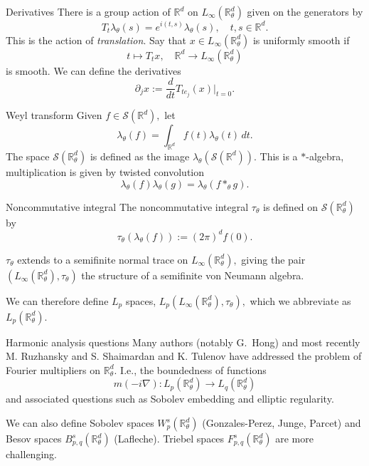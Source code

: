 \documentclass{beamer}
\numberwithin{equation}{section}
\theoremstyle{plain}
\theoremstyle{plain}
\theoremstyle{definition}
\theoremstyle{plain}
\theoremstyle{plain}
\theoremstyle{definition}
\newcommand{\Rl}{\mathbb{R}}
\newcommand{\Sc}{\mathcal{S}}
\begin{document}
\begin{frame}{Derivatives}
    There is a group action of $\Rl^d$ on $L_\infty(\Rl^d_\theta)$ given on the generators by
    \[
        T_{t}\lambda_\theta(s) = e^{i(t,s)}\lambda_\theta(s),\quad t,s\in \Rl^d.
    \]
    This is the action of \emph{translation}. Say that $x \in L_{\infty}(\Rl^d_\theta)$ is uniformly smooth if
    \[
        t\mapsto T_tx,\quad \Rl^d\to L_{\infty}(\Rl^d_\theta)
    \]
    is smooth. We can define the derivatives
    \[
        \partial_jx := \frac{d}{dt} T_{te_j}(x)|_{t=0}.
    \]
\end{frame}

\begin{frame}{Weyl transform}
    Given $f \in \Sc(\Rl^d),$ let
    \[
        \lambda_\theta(f) = \int_{\Rl^d} f(t)\lambda_\theta(t)\,dt.
    \]
    The space $\Sc(\Rl^d_\theta)$ is defined as the image $\lambda_\theta(\Sc(\Rl^d)).$ This is a $*$-algebra, multiplication is given by twisted convolution
    \[
        \lambda_\theta(f)\lambda_\theta(g) = \lambda_\theta(f\ast_\theta g).
    \]
\end{frame}

\begin{frame}{Noncommutative integral}
    The noncommutative integral $\tau_\theta$ is defined on $\Sc(\Rl^d_\theta)$ by
    \[
        \tau_\theta(\lambda_\theta(f)) := (2\pi)^d f(0).
    \]
    \begin{theorem}
        $\tau_\theta$ extends to a semifinite normal trace on $L_{\infty}(\Rl^d_\theta),$ giving the pair $(L_{\infty}(\Rl^d_\theta),\tau_\theta)$ the structure of a semifinite von Neumann algebra.
    \end{theorem}
    We can therefore define $L_p$ spaces, $L_p(L_{\infty}(\Rl^d_\theta),\tau_\theta),$ which we abbreviate as $L_p(\Rl^d_\theta).$
\end{frame}

\begin{frame}{Harmonic analysis questions}
    Many authors (notably G.~Hong) and most recently M. Ruzhansky and S. Shaimardan and K. Tulenov have addressed the problem of Fourier multipliers on $\Rl^d_\theta.$ I.e., the boundedness of functions
    \[
        m(-i\nabla):L_p(\Rl^d_\theta)\to L_{q}(\Rl^d_\theta)
    \]
    and associated questions such as Sobolev embedding and elliptic regularity.\pause

    We can also define Sobolev spaces $W^s_p(\Rl^d_\theta)$ (Gonzales-Perez, Junge, Parcet) and Besov spaces $B^s_{p,q}(\Rl^d_\theta)$ (Lafleche). Triebel spaces $F^s_{p,q}(\Rl^d_\theta)$ are more challenging.
\end{frame}
\end{document}
